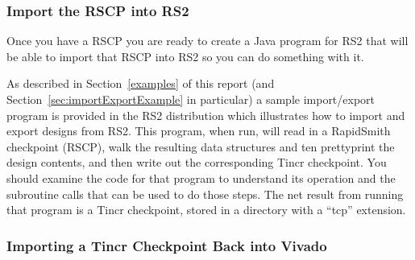 \subsubsection{Import the RSCP into RS2}
Once you have a RSCP you are ready to create a Java program for RS2 that will be
able to import that RSCP into RS2 so you can do something with it.

As described in Section~\ref{examples} of this report (and
Section~\ref{sec:importExportExample} in particular) a sample import/export program
is provided in the RS2 distribution which illustrates how to import
and export designs from RS2.  This program, when run, will read in a
RapidSmith checkpoint (RSCP), walk the resulting data structures and
ten prettyprint the design contents, and then write out the
corresponding Tincr checkpoint.   You should examine the code for that
program to understand its operation and the subroutine calls that can
be used to do those steps.  The net result from running that program
is a Tincr checkpoint, stored in a directory with a ``tcp'' extension.

\subsubsection{Importing a Tincr Checkpoint Back into Vivado}
